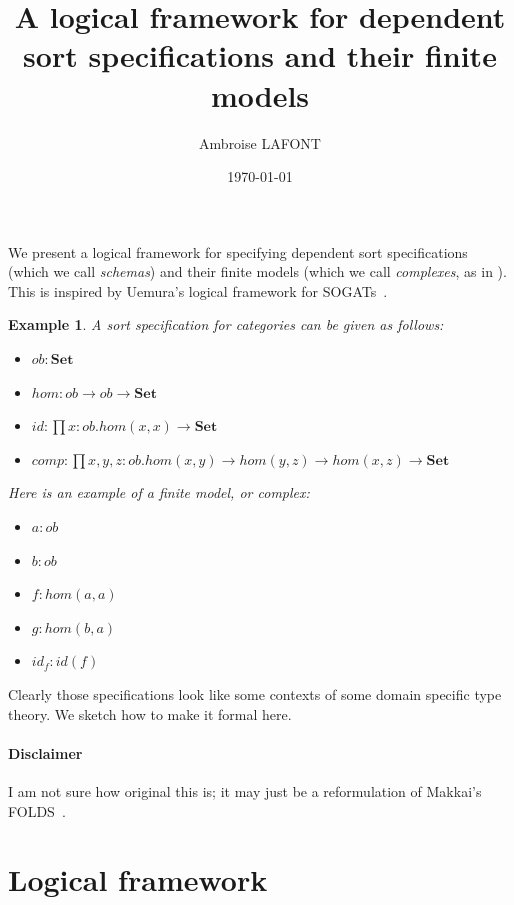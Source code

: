 \documentclass{article}
\title{A logical framework for dependent sort specifications and their finite models}
\author{Ambroise LAFONT}
\date{\today}
\newtheorem{example}{Example}
\begin{document}
\maketitle
We present a logical framework for specifying dependent sort specifications (which we call \emph{schemas}) 
and their finite models (which we call \emph{complexes}, as in \cite{leenasubramaniam}).
This is inspired by Uemura's logical framework for SOGATs~\cite{DBLP:journals/mscs/Uemura23}.
\begin{example}
    \label{excat}
    A sort specification for categories can be given as follows:
    \begin{itemize}
        \item $ob: 𝐒𝐞𝐭$
        \item $hom: ob → ob → 𝐒𝐞𝐭$
        \item $id: ∏ x: ob. hom(x, x) → 𝐒𝐞𝐭$
        \item $comp: ∏ x, y, z: ob. hom(x, y) → hom(y, z) → hom(x, z) → 𝐒𝐞𝐭$
    \end{itemize}
Here is an example of a finite model, or complex:
    \begin{itemize}
        \item $a:ob$
        \item $b:ob$
        \item $f:hom(a, a)$
        \item $g:hom(b, a)$
        \item $id_f:id(f)$
    \end{itemize}    
\end{example}

Clearly those specifications look like 
some contexts of some domain specific type theory.
We sketch how to make it formal here.
\paragraph{Disclaimer} I am not sure how original this is;
it may just be a reformulation of Makkai's FOLDS~\cite{MakkaiFirstOL}.

\section{Logical framework}
\end{document}
